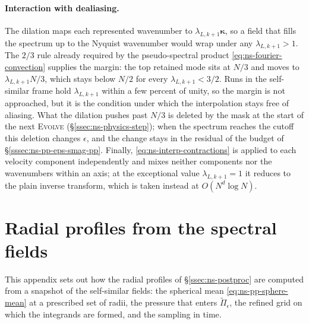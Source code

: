 \documentclass{article}
\begin{document}
\paragraph{Interaction with dealiasing.}
The dilation maps each represented wavenumber to $\lambda_{L,k+1} \boldsymbol{\kappa}$,
so a field that fills the spectrum up to the Nyquist wavenumber would wrap
under any $\lambda_{L,k+1} > 1$. The $2/3$ rule already required by the
pseudo-spectral product \eqref{eq:ns-fourier-convection} supplies the margin:
the top retained mode sits at $N/3$ and moves to $\lambda_{L,k+1} N/3$, which
stays below $N/2$ for every $\lambda_{L,k+1} < 3/2$. Runs in the self-similar
frame hold $\lambda_{L,k+1}$ within a few percent of unity, so the margin is
not approached, but it is the condition under which the interpolation stays
free of aliasing. What the dilation pushes past $N/3$ is deleted by the mask
at the start of the next \textsc{Evolve} (\S\ref{ssec:ns-physics-step}); when
the spectrum reaches the cutoff this deletion changes $\epsilon$, and the
change stays in the residual of the budget of
\S\ref{sssec:ns-pp-eps-smag-pp}. Finally, \eqref{eq:ns-interp-contractions} is applied to
each velocity component independently and mixes neither components nor the
wavenumbers within an axis; at the exceptional value $\lambda_{L,k+1} = 1$ it
reduces to the plain inverse transform, which is taken instead at
$O(N^d \log N)$.


\section{Radial profiles from the spectral fields}\label{app:radial}

This appendix sets out how the radial profiles of
\S\ref{ssec:ns-postproc} are computed from a snapshot of the self-similar
fields: the spherical mean \eqref{eq:ns-pp-sphere-mean} at a prescribed set of
radii, the pressure that enters $\tilde \Pi_\epsilon$, the
refined grid on which the integrands are formed, and the sampling in
time.
\end{document}
